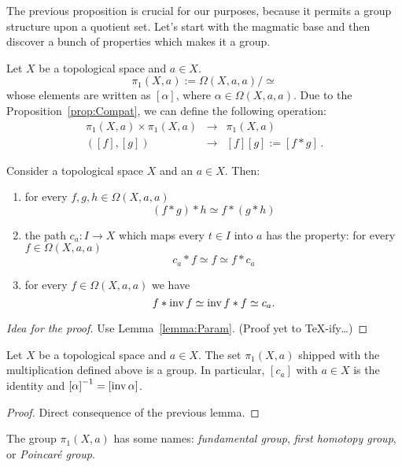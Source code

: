 The previous proposition is crucial for our purposes, because it permits a group structure upon a quotient set. Let's start with the magmatic base and then discover a bunch of properties which makes it a group.

\begin{definition}
Let \(X\) be a topological space and \(a \in X\).
\[\pi_1(X, a) := \Omega(X, a, a)/\simeq\]
whose elements are written as \([\alpha]\), where \(\alpha \in \Omega(X, a, a)\). Due to the Proposition~\ref{prop:Compat}, we can define the following operation:
\[\begin{array}{ccc}
\pi_1(X, a) \times \pi_1(X, a)  & \to & \pi_1(X, a) \\
([f], [g])                      & \to &  [f][g] := [f \ast g]\,.
\end{array}\]
\end{definition}

\begin{lemma}
Consider a topological space \(X\) and an \(a \in X\). Then:
\begin{enumerate}
\item for every \(f, g, h \in \Omega(X, a, a)\)
\[(f \ast g) \ast h \simeq f \ast (g \ast h)\]
\item the path \(c_a : I \to X\) which maps every \(t \in I\) into \(a\) has the property: for every \(f \in \Omega(X, a, a)\)
\[c_a \ast f \simeq f \simeq f \ast c_a\]
\item for every \(f \in \Omega(X, a, a)\) we have
\[f \ast \operatorname{inv} f \simeq \operatorname{inv} f \ast f \simeq c_a.\]
\end{enumerate}
\end{lemma}

\begin{proof}[Idea for the proof]
Use Lemma~\ref{lemma:Param}. (Proof yet to \TeX{}-ify\dots{})
\end{proof}

\begin{proposition}
Let \(X\) be a topological space and \(a \in X\). The set \(\pi_1(X, a)\) shipped with the multiplication defined above is a group. In particular, \([c_a]\) with \(a \in X\) is the identity and \({[\alpha]}^{-1} = [\operatorname{inv}\alpha]\).
\end{proposition}

\begin{proof}
Direct consequence of the previous lemma.
\end{proof}

The group \(\pi_1(X, a)\) has some names: {\em fundamental group}, {\em first homotopy group}, or {\em Poincaré group}.

